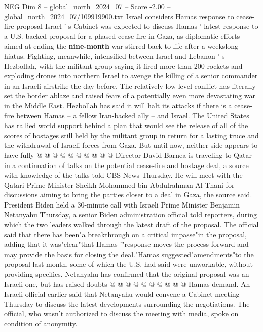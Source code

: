 \begin{textsample}{NEG Dim 8 – global\_north\_2024\_07 – Score -2.00 – global\_north\_2024\_07/109919900.txt}  \label{ex:f8_neg_181}
Israel considers Hamas response to cease-fire proposal Israel ' s Cabinet was expected to discuss Hamas ' latest response to a U.S.-backed proposal for a phased cease-fire in Gaza, as diplomatic efforts aimed at ending the \textbf{nine-month} war stirred back to life after a weekslong hiatus.
Fighting, meanwhile, intensified between Israel and Lebanon ' s Hezbollah, with the militant group saying it fired more than 200 rockets and exploding drones into northern Israel to avenge the killing of a senior commander in an Israeli airstrike the day before.
The relatively low-level conflict has literally set the border ablaze and raised fears of a potentially even more devastating war in the Middle East.
Hezbollah has said it will halt its attacks if there is a cease-fire between Hamas -- a fellow Iran-backed ally -- and Israel.
The United States has rallied world support behind a plan that would see the release of all of the scores of hostages still held by the militant group in return for a lasting truce and the withdrawal of Israeli forces from Gaza.
But until now, neither side appears to have fully @ @ @ @ @ @ @ @ @ @ Director David Barnea is traveling to Qatar in a continuation of talks on the potential cease-fire and hostage deal, a source with knowledge of the talks told CBS News Thursday.
He will meet with the Qatari Prime Minister Sheikh Mohammed bin Abdulrahman Al Thani for discussions aiming to bring the parties closer to a deal in Gaza, the source said.
President Biden held a 30-minute call with Israeli Prime Minister Benjamin Netanyahu Thursday, a senior Biden administration official told reporters, during which the two leaders walked through the latest draft of the proposal.
The official said that there has been"a breakthrough on a critical impasse"in the proposal, adding that it was"clear"that Hamas '"response moves the process forward and may provide the basis for closing the deal."Hamas suggested"amendments"to the proposal last month, some of which the U.S. had said were unworkable, without providing specifics.
Netanyahu has confirmed that the original proposal was an Israeli one, but has raised doubts @ @ @ @ @ @ @ @ @ @ Hamas demand.
An Israeli official earlier said that Netanyahu would convene a Cabinet meeting Thursday to discuss the latest developments surrounding the negotiations.
The official, who wasn't authorized to discuss the meeting with media, spoke on condition of anonymity.

\end{textsample}
